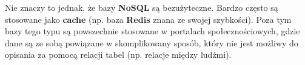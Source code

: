 \documentclass[a4paper,11pt]{article}
\begin{document}
Nie znaczy to jednak, że bazy \textbf{NoSQL} są bezużyteczne. Bardzo często są stosowane jako \textbf{cache} (np. baza \textbf{Redis} znana ze swojej szybkości). Poza tym bazy tego typu są powszechnie stosowane w portalach społecznościowych,
gdzie dane są ze sobą powiązane w skomplikowany sposób, który nie jest możliwy do opisania za pomocą relacji tabel (np. relacje między ludźmi).
\end{document}
